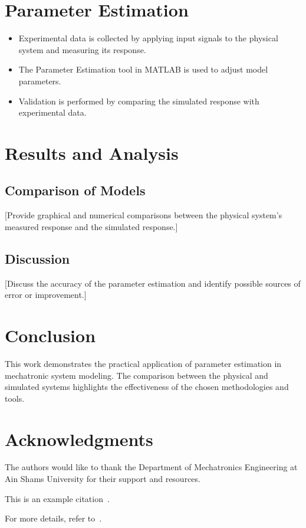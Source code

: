 \documentclass{article}
\begin{document}
\section{Parameter Estimation}
\begin{itemize}
    \item Experimental data is collected by applying input signals to the physical system and measuring its response.
    \item The Parameter Estimation tool in MATLAB is used to adjust model parameters.
    \item Validation is performed by comparing the simulated response with experimental data.
\end{itemize}

\section{Results and Analysis}
\subsection{Comparison of Models}
[Provide graphical and numerical comparisons between the physical system's measured response and the simulated response.]

\subsection{Discussion}
[Discuss the accuracy of the parameter estimation and identify possible sources of error or improvement.]

\section{Conclusion}
This work demonstrates the practical application of parameter estimation in mechatronic system modeling. The comparison between the physical and simulated systems highlights the effectiveness of the chosen methodologies and tools.

\section*{Acknowledgments}
The authors would like to thank the Department of Mechatronics Engineering at Ain Shams University for their support and resources.


This is an example citation~\cite{example_reference}. %

For more details, refer to~\cite{another_reference}.
\end{document}

